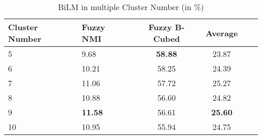 \begin{table}[htbp!] %
    \centering
    \begin{tabular}{llcccc}
    \toprule
    Cluster Number   & Fuzzy NMI     & Fuzzy B-Cubed  & Average    \\
    \midrule
    5                & 9.68          & \bf{58.88}     & 23.87      \\
    6                & 10.21         & 58.25          & 24.39      \\
    7                & 11.06         & 57.72          & 25.27      \\
    8                & 10.88         & 56.60          & 24.82      \\
    9                & \bf{11.58}    & 56.61          & \bf{25.60} \\
    10               & 10.95         & 55.94          & 24.75      \\
    \bottomrule
    \end{tabular}
\caption{BiLM in multiple Cluster Number (in \%)}
\label{tab:embedding}
\end{table}
